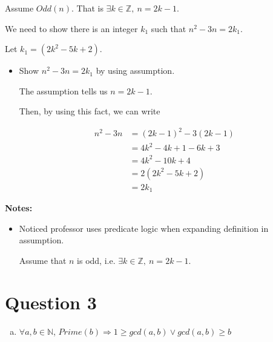 \documentclass[12pt]{article}
\begin{document}
\begin{enumerate}[a.]
\begin{mdframed}
        \bigskip

        Assume $Odd(n)$. That is $\exists k \in \mathbb{Z},\:n = 2k - 1$.

        \bigskip

        We need to show there is an integer $k_1$ such that $n^2 - 3n = 2k_1$.

        \bigskip

        Let $k_1 = (2k^2 - 5k + 2)$.

        \bigskip

        \begin{itemize}
            \item Show $n^2 - 3n = 2k_1$ by using assumption.

            \bigskip

            \begin{mdframed}
            The assumption tells us $n = 2k-1$.

            \bigskip

            Then, by using this fact, we can write

            \begin{align}
                n^2 - 3n &= (2k-1)^2 - 3(2k-1)\\
                &= 4k^2-4k+1-6k+3\\
                &= 4k^2 -10k + 4\\
                &= 2(2k^2 - 5k + 2)\\
                &= 2k_1
            \end{align}
            \end{mdframed}

        \end{itemize}

    \end{mdframed}

    \bigskip

    \textbf{Notes:}

    \begin{itemize}
        \item Noticed professor uses predicate logic when expanding definition in
        assumption.

        \begin{mdframed}
        Assume that $n$ is odd, i.e. $\exists k \in \mathbb{Z},\:n = 2k -1$.
        \end{mdframed}

    \end{itemize}

\end{enumerate}

\section*{Question 3}
\begin{enumerate}[a.]
    \item $\forall a,b \in \mathbb{N}$, $Prime(b) \Rightarrow 1 \geq gcd(a,b) \lor gcd(a,b) \geq b$
\end{enumerate}
\end{document}
